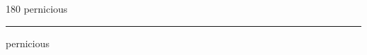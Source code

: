 
\begin{frame}
\begin{center}
\begin{turn}{180}
{\fontsize{2.5cm}{1em}\selectfont pernicious}
\end{turn}
\vspace{1em}\par  
\hrule
\vspace{1em}\par  
{\fontsize{2.5cm}{1em}\selectfont pernicious}
\end{center}
\end{frame}

